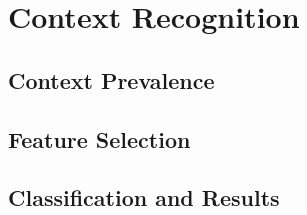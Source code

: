 \section{Context Recognition}
\subsection{Context Prevalence}
\subsection{Feature Selection}
\subsection{Classification and Results}

